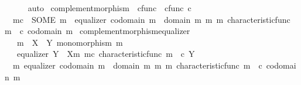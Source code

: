 \begin{isabellebody}
\ \ \ \ \isamarkupfalse%
\ auto\isanewline
{}\isamarkupfalse%
%
\endisatagproof
{\isafoldproof}%
%
\isadelimproof
\isanewline
%
\endisadelimproof
\isanewline
{}\isamarkupfalse%
\ complement{\isacharunderscore}{\kern0pt}morphism\ {\isacharcolon}{\kern0pt}{\isacharcolon}{\kern0pt}\ {\isachardoublequoteopen}cfunc\ {\isasymRightarrow}\ cfunc{\isachardoublequoteclose}\ {\isacharparenleft}{\kern0pt}{\isachardoublequoteopen}{\isacharunderscore}{\kern0pt}\isactrlsup c{\isachardoublequoteclose}\ {\isacharbrackleft}{\kern0pt}{}{}{}{}{\isacharbrackright}{\kern0pt}{\isacharparenright}{\kern0pt}\ \isanewline
\ \ {\isachardoublequoteopen}m\isactrlsup c\ {\isacharequal}{\kern0pt}\ {\isacharparenleft}{\kern0pt}SOME\ m{\isacharprime}{\kern0pt}{\isachardot}{\kern0pt}\ \ equalizer\ {\isacharparenleft}{\kern0pt}codomain\ m\ {\isasymsetminus}\ {\isacharparenleft}{\kern0pt}domain\ m{\isacharcomma}{\kern0pt}\ m{\isacharparenright}{\kern0pt}{\isacharparenright}{\kern0pt}\ m{\isacharprime}{\kern0pt}\ {\isacharparenleft}{\kern0pt}characteristic{\isacharunderscore}{\kern0pt}func\ m{\isacharparenright}{\kern0pt}\ {\isacharparenleft}{\kern0pt}{\isasymf}\ {\isasymcirc}\isactrlsub c\ {\isasymbeta}\isactrlbsub codomain\ m\isactrlesub {\isacharparenright}{\kern0pt}{\isacharparenright}{\kern0pt}{\isachardoublequoteclose}\isanewline
\isanewline
{}\isamarkupfalse%
\ complement{\isacharunderscore}{\kern0pt}morphism{\isacharunderscore}{\kern0pt}equalizer{\isacharcolon}{\kern0pt}\isanewline
\ \ \ {\isachardoublequoteopen}m\ {\isacharcolon}{\kern0pt}\ X\ {\isasymrightarrow}\ Y{\isachardoublequoteclose}\ {\isachardoublequoteopen}monomorphism\ m{\isachardoublequoteclose}\isanewline
\ \ \ {\isachardoublequoteopen}equalizer\ {\isacharparenleft}{\kern0pt}Y\ {\isasymsetminus}\ {\isacharparenleft}{\kern0pt}X{\isacharcomma}{\kern0pt}m{\isacharparenright}{\kern0pt}{\isacharparenright}{\kern0pt}\ m\isactrlsup c\ {\isacharparenleft}{\kern0pt}characteristic{\isacharunderscore}{\kern0pt}func\ m{\isacharparenright}{\kern0pt}\ {\isacharparenleft}{\kern0pt}{\isasymf}\ {\isasymcirc}\isactrlsub c\ {\isasymbeta}\isactrlbsub Y\isactrlesub {\isacharparenright}{\kern0pt}{\isachardoublequoteclose}\isanewline
%
\isadelimproof
%
\endisadelimproof
%
\isatagproof
{}\isamarkupfalse%
\ {\isacharminus}{\kern0pt}\isanewline
\ \ \isamarkupfalse%
\ {\isachardoublequoteopen}{\isasymexists}\ m{\isacharprime}{\kern0pt}{\isachardot}{\kern0pt}\ equalizer\ {\isacharparenleft}{\kern0pt}codomain\ m\ {\isasymsetminus}\ {\isacharparenleft}{\kern0pt}domain\ m{\isacharcomma}{\kern0pt}\ m{\isacharparenright}{\kern0pt}{\isacharparenright}{\kern0pt}\ m{\isacharprime}{\kern0pt}\ {\isacharparenleft}{\kern0pt}characteristic{\isacharunderscore}{\kern0pt}func\ m{\isacharparenright}{\kern0pt}\ {\isacharparenleft}{\kern0pt}{\isasymf}\ {\isasymcirc}\isactrlsub c\ {\isasymbeta}\isactrlbsub codomain\ m\isactrlesub {\isacharparenright}{\kern0pt}{\isachardoublequoteclose}\isanewline

\end{isabellebody}
